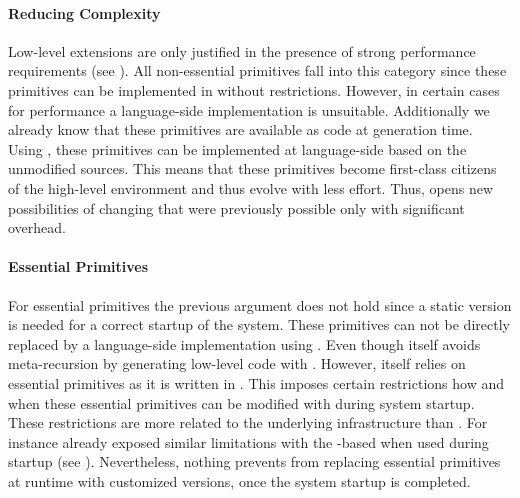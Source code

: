 \paragraph{Reducing \VM Complexity}
Low-level \VM extensions are only justified in the presence of strong performance requirements (see ).
All non-essential primitives fall into this category since these primitives can be implemented in \PH without restrictions.
However, in certain cases for performance a language-side implementation is unsuitable.
Additionally we already know that these primitives are available as \Slang code at \VM generation time.
Using \WF, these primitives can be implemented at language-side based on the unmodified \Slang sources.
This means that these primitives become first-class citizens of the high-level environment and thus evolve with less effort.
Thus, \WF opens new possibilities of changing \PH that were previously possible only with significant overhead.

\paragraph{Essential Primitives}
For essential primitives the previous argument does not hold since a static version is needed for a correct startup of the system.
These primitives can not be directly replaced by a language-side implementation using \WF.
Even though \WF itself avoids meta-recursion by generating low-level code with \B.
However, \B itself relies on essential primitives as it is written in \PH.
This imposes certain restrictions how and when these essential primitives can be modified with \WF during system startup.
These restrictions are more related to the underlying \B infrastructure than \WF.
For instance already exposed similar limitations with the \B-based \FFI when used during startup (see ).
Nevertheless, nothing prevents from replacing essential primitives at runtime with customized versions, once the system startup is completed. 

